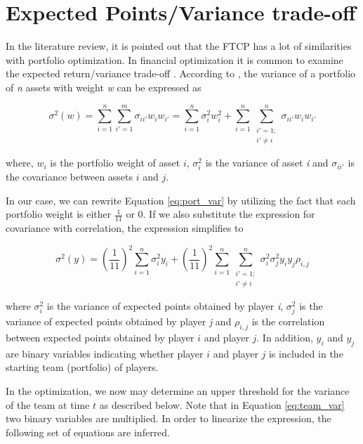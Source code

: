 \newpage
\section{Expected Points/Variance trade-off} \label{Ch.5_Variance_tradeoff}

In the literature review, it is pointed out that the FTCP has a lot of similarities with portfolio optimization. In financial optimization it is common to examine the expected return/variance trade-off \citep{Markowitz}. According to \cite{Zenios}, the variance of a portfolio of \textit{n} assets with weight \textit{w} can be expressed as 

\begin{equation}
    \sigma^2(w) = \sum_{i = 1}^{n}\sum_{i' = 1}^{m}\sigma_{ii'}w_iw_{i'} = \sum_{i = 1}^{n}\sigma_{i}^2w_i^2 + \sum_{i = 1}^{n}\sum_{\substack{i' = 1;\\ i' \neq i}}^{n}\sigma_{ii'}w_iw_{i'}
    \label{eq:port_var}
\end{equation}

where, $w_i$ is the portfolio weight of asset $i$, $\sigma_{i}^2$ is the variance of asset \textit{i} and $\sigma_{ii'}$ is the covariance between assets $i$ and $j$. \newpar

In our case, we can rewrite Equation \ref{eq:port_var} by utilizing the fact that each portfolio weight is either $\frac{1}{11}$ or $0$. If we also substitute the expression for covariance with correlation, the expression simplifies to

\begin{equation}
    \sigma^2(y) = (\frac{1}{11})^2\sum_{i = 1}^{n}\sigma_i^2y_i + (\frac{1}{11})^2\sum_{i = 1}^{n}\sum_{\substack{i' = 1;\\ i' \neq i}}^{n} \sigma_i^2\sigma_j^2y_iy_j\rho_{i,j}
    \label{eq:team_var}
\end{equation}

where $\sigma_{i}^2$ is the variance of expected points obtained by player \textit{i}, $\sigma_{j}^2$ is the variance of expected points obtained by player \textit{j} and $\rho_{i,j}$ is the correlation between expected points obtained by player $i$ and player $j$. In addition, $y_i$ and $y_j$ are binary variables indicating whether player $i$ and player $j$ is included in the starting team (portfolio) of players.\newline

In the optimization, we now may determine an upper threshold for the variance of the team at time $t$ as described below. Note that in Equation \ref{eq:team_var} two binary variables are multiplied. In order to linearize the expression, the following set of equations are inferred.

